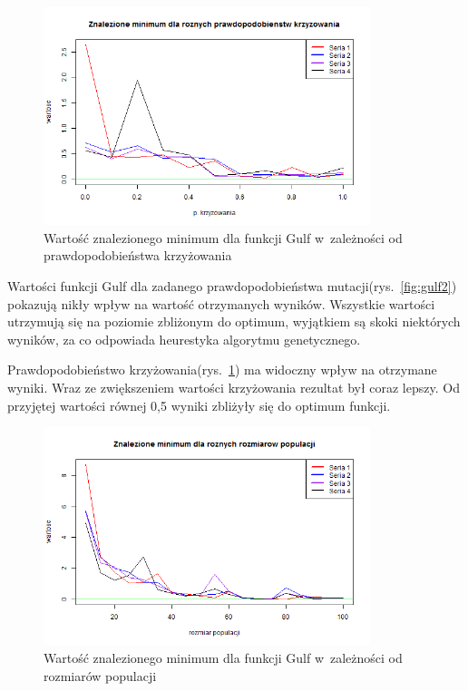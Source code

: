 \documentclass[11pt, a4paper]{article}
\newcommand{\fbi}{\leavevmode{\parindent=1em\indent}}
\begin{document}
\begin{figure}[H]
	\begin{center}
		\includegraphics[width=0.85\textwidth]{./assets/Gulf3.png}
		\caption{Wartość znalezionego minimum dla funkcji Gulf w~zależności od prawdopodobieństwa krzyżowania}
		\label{fig:gulf3}
	\end{center}
\end{figure}

\fbi
Wartości funkcji Gulf dla zadanego prawdopodobieństwa mutacji(rys.~\ref{fig:gulf2}) pokazują nikły wpływ na wartość otrzymanych wyników. Wszystkie wartości utrzymują się na poziomie zbliżonym do optimum, wyjątkiem są skoki niektórych wyników, za co odpowiada heurestyka algorytmu genetycznego.

\fbi
Prawdopodobieństwo krzyżowania(rys.~\ref{fig:gulf3}) ma widoczny wpływ na otrzymane wyniki. Wraz ze zwiększeniem wartości krzyżowania rezultat był coraz lepszy. Od przyjętej wartości równej 0,5 wyniki zbliżyły się do optimum funkcji.

\begin{figure}[H]
	\begin{center}
		\includegraphics[width=0.85\textwidth]{./assets/Gulf4.png}
		\caption{Wartość znalezionego minimum dla funkcji Gulf w~zależności od rozmiarów populacji}
		\label{fig:gulf4}
	\end{center}
\end{figure}
\end{document}
